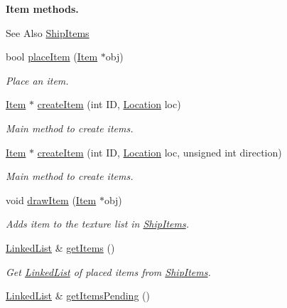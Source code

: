 \begin{Indent}{\bf Item methods.}\par
{\em \begin{DoxySeeAlso}{See Also}
\hyperlink{classShipItems}{Ship\-Items} 
\end{DoxySeeAlso}
}\begin{DoxyCompactItemize}
\item 
bool \hyperlink{classShipMaster_aa9e9c11a116929e94bee491ab8dacf49}{place\-Item} (\hyperlink{classItem}{Item} $\ast$obj)
\begin{DoxyCompactList}\small\item\em Place an item. \end{DoxyCompactList}\item 
\hyperlink{classItem}{Item} $\ast$ \hyperlink{classShipMaster_a0e90a2352a439464d922d3fda25d71ca}{create\-Item} (int I\-D, \hyperlink{structLocation}{Location} loc)
\begin{DoxyCompactList}\small\item\em Main method to create items. \end{DoxyCompactList}\item 
\hyperlink{classItem}{Item} $\ast$ \hyperlink{classShipMaster_a07e5d7b5b90d5c5efc405175a3e93c3b}{create\-Item} (int I\-D, \hyperlink{structLocation}{Location} loc, unsigned int direction)
\begin{DoxyCompactList}\small\item\em Main method to create items. \end{DoxyCompactList}\item 
void \hyperlink{classShipMaster_ab378e743c7200449d2ac6d3b2c6c8f63}{draw\-Item} (\hyperlink{classItem}{Item} $\ast$obj)
\begin{DoxyCompactList}\small\item\em Adds item to the texture list in \hyperlink{classShipItems}{Ship\-Items}. \end{DoxyCompactList}\item 
\hyperlink{classLinkedList}{Linked\-List} \& \hyperlink{classShipMaster_a627afea5fc5988ad18c8a2dc4dcc7d91}{get\-Items} ()
\begin{DoxyCompactList}\small\item\em Get \hyperlink{classLinkedList}{Linked\-List} of placed items from \hyperlink{classShipItems}{Ship\-Items}. \end{DoxyCompactList}\item 
\hyperlink{classLinkedList}{Linked\-List} \& \hyperlink{classShipMaster_a28b969e9befa8df4df7fcf253aa3a119}{get\-Items\-Pending} ()

\end{DoxyCompactItemize}
\end{Indent}
